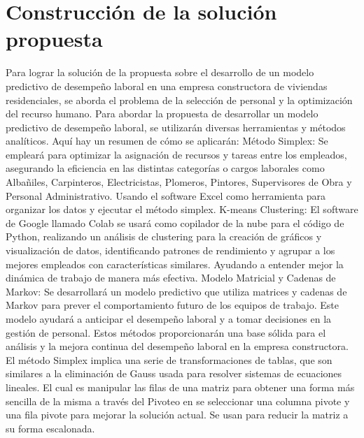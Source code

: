 \documentclass{plantillauft}
\begin{document}
\section{Construcción de la solución propuesta}
Para lograr la solución de la propuesta sobre el desarrollo de un modelo predictivo de desempeño laboral en una empresa constructora de viviendas residenciales, se aborda el problema de la selección de personal y la optimización del recurso humano.
\newline
\newline
Para abordar la propuesta de desarrollar un modelo predictivo de desempeño laboral, se utilizarán diversas herramientas y métodos analíticos. Aquí hay un resumen de cómo se aplicarán:
\newline
\newline
Método Simplex: Se empleará para optimizar la asignación de recursos y tareas entre los empleados, asegurando la eficiencia en las distintas categorías o cargos laborales como Albañiles, Carpinteros, Electricistas, Plomeros, Pintores, Supervisores de Obra y Personal Administrativo. Usando el software Excel como herramienta para organizar los datos y ejecutar el método simplex.
\newline
\newline
K-means Clustering: El software de Google llamado Colab se usará como copilador de la nube para el código de Python, realizando un análisis de clustering para la creación de gráficos y visualización de datos, identificando patrones de rendimiento y agrupar a los mejores empleados con características similares. Ayudando a entender mejor la dinámica de trabajo de manera más efectiva.
\newline
\newline
Modelo Matricial y Cadenas de Markov: Se desarrollará un modelo predictivo que utiliza matrices y cadenas de Markov para prever el comportamiento futuro de los equipos de trabajo. Este modelo ayudará a anticipar el desempeño laboral y a tomar decisiones en la gestión de personal.
\newline
\newline
Estos métodos proporcionarán una base sólida para el análisis y la mejora continua del desempeño laboral en la empresa constructora.
\newline
\newline
El método Simplex implica una serie de transformaciones de tablas, que son similares a la eliminación de Gauss usada para resolver sistemas de ecuaciones lineales. El cual es manipular las filas de una matriz para obtener una forma más sencilla de la misma a través del Pivoteo en se seleccionar una columna pivote y una fila pivote para mejorar la solución actual. Se usan para reducir la matriz a su forma escalonada.
\end{document}
